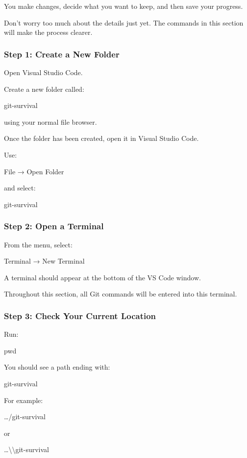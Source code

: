 \documentclass{csc2059practical}
\begin{document}
You make changes, decide what you want to keep, and then save your progress.

Don't worry too much about the details just yet. The commands in this section will make the process clearer.

\subsubsection{Step 1: Create a New Folder}
Open Visual Studio Code.

Create a new folder called:

\begin{terminalplain}
git-survival
\end{terminalplain}
using your normal file browser.

Once the folder has been created, open it in Visual Studio Code.

Use:

File → Open Folder

and select:

\begin{terminalplain}
git-survival
\end{terminalplain}
\subsubsection{Step 2: Open a Terminal}
From the menu, select:

Terminal → New Terminal

A terminal should appear at the bottom of the VS Code window.

Throughout this section, all Git commands will be entered into this terminal.

\subsubsection{Step 3: Check Your Current Location}
Run:

\begin{terminalplain}
pwd
\end{terminalplain}
You should see a path ending with:

\begin{terminalplain}
git-survival
\end{terminalplain}
For example:

\ldots{}/git-survival

or

\ldots{}\textbackslash{}\textbackslash{}git-survival
\end{document}

